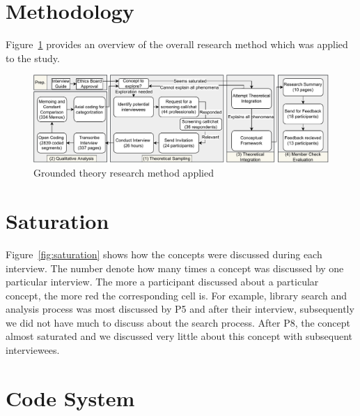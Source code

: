 \pagebreak
\section{Methodology}

Figure~\ref{fig:methodology} provides an overview of the overall research method which was applied to the study.

\begin{figure}
    \centering
    \includegraphics[scale=.75]{images/methodology.pdf}
    \caption{Grounded theory research method applied}
    \label{fig:methodology}
\end{figure}


\section{Saturation}

Figure~\ref{fig:saturation} shows how the concepts were discussed during each interview. The number denote how many times a concept was discussed by one particular interview. The more a participant discussed about a particular concept, the more red the corresponding cell is. For example, library search and analysis process was most discussed by P5 and after their interview, subsequently we did not have much to discuss about the search process.  After P8, the concept almost saturated and we discussed very little about this concept with subsequent interviewees.





\section{Code System}

